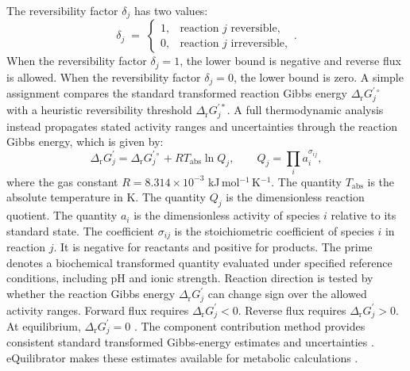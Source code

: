 The reversibility factor $\delta_j$ has two values:
\begin{equation}\label{eq:thermo-gate}
  \delta_j \;=\;
  \begin{cases}
    1, & \text{reaction $j$ reversible},\\[2pt]
    0, & \text{reaction $j$ irreversible},
  \end{cases}.
\end{equation}
When the reversibility factor $\delta_j=1$, the lower bound is negative and
reverse flux is allowed. When the reversibility factor $\delta_j=0$, the lower
bound is zero. A simple assignment compares the standard transformed reaction
Gibbs energy $\Delta_{\mathrm r}G_j^{\prime\circ}$ with a heuristic
reversibility threshold $\Delta_{\mathrm r}G_j^{\prime *}$. A full
thermodynamic analysis instead propagates stated activity ranges and
uncertainties through the reaction Gibbs energy, which is given by:
\begin{equation}\label{eq:reaction-gibbs}
  \Delta_{\mathrm r}G_j^{\prime}
  = \Delta_{\mathrm r}G_j^{\prime\circ}
  + RT_{\mathrm{abs}}\ln Q_j,
  \qquad
  Q_j = \prod_i a_i^{\sigma_{ij}},
\end{equation}
where the gas constant $R=8.314\times10^{-3}$ kJ\,mol$^{-1}$\,K$^{-1}$.
The quantity $T_{\mathrm{abs}}$ is the absolute temperature in K. The quantity
$Q_j$ is the dimensionless reaction quotient. The quantity $a_i$ is the dimensionless
activity of species $i$ relative to its standard state. The coefficient
$\sigma_{ij}$ is the stoichiometric coefficient of species $i$ in reaction
$j$. It is negative for reactants and positive for products. The prime denotes a
biochemical transformed quantity evaluated under specified reference
conditions, including pH and ionic strength. Reaction direction is tested by
whether the reaction Gibbs energy $\Delta_{\mathrm r}G_j^{\prime}$ can change
sign over the allowed activity ranges. Forward flux requires
$\Delta_{\mathrm r}G_j^{\prime}<0$. Reverse flux requires
$\Delta_{\mathrm r}G_j^{\prime}>0$. At equilibrium,
$\Delta_{\mathrm r}G_j^{\prime}=0$ \cite{Henry2007}. The component
contribution method provides consistent standard transformed Gibbs-energy
estimates and uncertainties \cite{Noor2013}. eQuilibrator makes these
estimates available for metabolic calculations \cite{Beber2022}.


